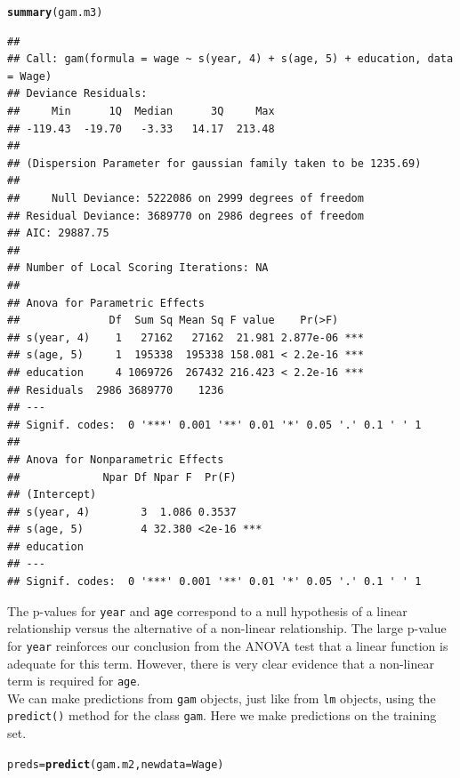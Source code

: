 \documentclass[12pt]{article}\usepackage[]{graphicx}\usepackage[]{color}
\makeatletter
\newcommand{\hlstd}[1]{\textcolor[rgb]{0.345,0.345,0.345}{#1}}%
\newcommand{\hlkwb}[1]{\textcolor[rgb]{0.69,0.353,0.396}{#1}}%
\newcommand{\hlkwc}[1]{\textcolor[rgb]{0.333,0.667,0.333}{#1}}%
\newcommand{\hlkwd}[1]{\textcolor[rgb]{0.737,0.353,0.396}{\textbf{#1}}}%
\newenvironment{kframe}{%
 \def\at@end@of@kframe{}%
 \ifinner\ifhmode%
  \def\at@end@of@kframe{\end{minipage}}%
  \begin{minipage}{\columnwidth}%
 \fi\fi%
 \def\FrameCommand##1{\hskip\@totalleftmargin \hskip-\fboxsep
 \colorbox{shadecolor}{##1}\hskip-\fboxsep
     \hskip-\linewidth \hskip-\@totalleftmargin \hskip\columnwidth}%
 \MakeFramed {\advance\hsize-\width
   \@totalleftmargin\z@ \linewidth\hsize
   \@setminipage}}%
 {\par\unskip\endMakeFramed%
 \at@end@of@kframe}
\newenvironment{knitrout}{}{} %
\makeatother
\begin{document}
\begin{knitrout}
\color{fgcolor}\begin{kframe}
\begin{alltt}
\hlkwd{summary}\hlstd{(gam.m3)}
\end{alltt}
\begin{verbatim}
## 
## Call: gam(formula = wage ~ s(year, 4) + s(age, 5) + education, data = Wage)
## Deviance Residuals:
##     Min      1Q  Median      3Q     Max 
## -119.43  -19.70   -3.33   14.17  213.48 
## 
## (Dispersion Parameter for gaussian family taken to be 1235.69)
## 
##     Null Deviance: 5222086 on 2999 degrees of freedom
## Residual Deviance: 3689770 on 2986 degrees of freedom
## AIC: 29887.75 
## 
## Number of Local Scoring Iterations: NA 
## 
## Anova for Parametric Effects
##              Df  Sum Sq Mean Sq F value    Pr(>F)    
## s(year, 4)    1   27162   27162  21.981 2.877e-06 ***
## s(age, 5)     1  195338  195338 158.081 < 2.2e-16 ***
## education     4 1069726  267432 216.423 < 2.2e-16 ***
## Residuals  2986 3689770    1236                      
## ---
## Signif. codes:  0 '***' 0.001 '**' 0.01 '*' 0.05 '.' 0.1 ' ' 1
## 
## Anova for Nonparametric Effects
##             Npar Df Npar F  Pr(F)    
## (Intercept)                          
## s(year, 4)        3  1.086 0.3537    
## s(age, 5)         4 32.380 <2e-16 ***
## education                            
## ---
## Signif. codes:  0 '***' 0.001 '**' 0.01 '*' 0.05 '.' 0.1 ' ' 1
\end{verbatim}
\end{kframe}
\end{knitrout}

The p-values for \texttt{year} and \texttt{age} correspond to a null hypothesis of a linear relationship versus the alternative of a non-linear relationship. The large p-value for \texttt{year} reinforces our conclusion from the ANOVA test that a linear function is adequate for this term. However, there is very clear evidence that a non-linear term is required for \texttt{age}.\\

We can make predictions from \texttt{gam} objects, just like from \texttt{lm} objects, using the \texttt{predict()} method for the class \texttt{gam}. Here we make predictions on the training set.

\begin{knitrout}
\color{fgcolor}\begin{kframe}
\begin{alltt}
\hlstd{preds} \hlkwb{=} \hlkwd{predict}\hlstd{(gam.m2,} \hlkwc{newdata}\hlstd{=Wage)}
\end{alltt}
\end{kframe}
\end{knitrout}
\end{document}
